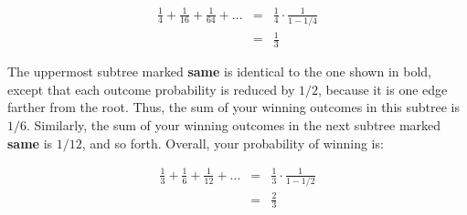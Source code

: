 \documentclass[12pt,twoside]{article}
\begin{document}
\begin{problem}{14}
{\begin{eqnarray*}
\frac{1}{4} + \frac{1}{16} + \frac{1}{64} + \ldots
	& = & \frac{1}{4} \cdot \frac{1}{1 - 1/4} \\
	& = & \frac{1}{3}
\end{eqnarray*}

The uppermost subtree marked {\bf same} is identical to the one
shown in bold, except that each outcome probability is reduced by
$1/2$, because it is one edge farther from the root.  Thus, the sum of
your winning outcomes in this subtree is $1/6$.  Similarly, the sum of
your winning outcomes in the next subtree marked {\bf same} is $1/12$,
and so forth.  Overall, your probability of winning is:

\begin{eqnarray*}
\frac{1}{3} + \frac{1}{6} + \frac{1}{12} + \ldots
	& = & \frac{1}{3} \cdot \frac{1}{1 - 1/2} \\
	& = & \frac{2}{3}
\end{eqnarray*}
}

\end{problem}
\end{document}
